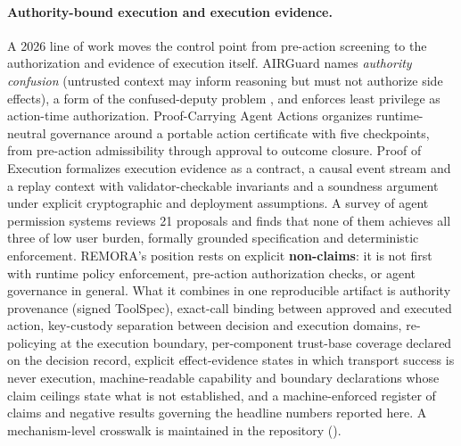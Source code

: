 \documentclass[10pt,twocolumn]{article}
\begin{document}
\paragraph{Authority-bound execution and execution evidence.}
A 2026 line of work moves the control point from pre-action screening to
the authorization and evidence of execution itself. AIRGuard
\cite{qin2026airguard} names \emph{authority confusion} (untrusted
context may inform reasoning but must not authorize side effects), a form
of the confused-deputy problem \cite{hardy1988confused}, and
enforces least privilege as action-time authorization. Proof-Carrying
Agent Actions \cite{wang2026pcaa} organizes runtime-neutral governance
around a portable action certificate with five checkpoints, from
pre-action admissibility through approval to outcome closure. Proof of
Execution \cite{rhodes2026poe} formalizes execution evidence as a
contract, a causal event stream and a replay context with
validator-checkable invariants and a soundness argument under explicit
cryptographic and deployment assumptions. A survey of agent permission
systems \cite{michael2026permission} reviews 21 proposals and finds
that none of them achieves all three of low user burden, formally
grounded specification and deterministic enforcement. REMORA's position rests on
explicit \textbf{non-claims}: it is not first with runtime policy
enforcement, pre-action authorization checks, or agent governance in
general. What it combines in one reproducible artifact is authority
provenance (signed ToolSpec), exact-call binding between approved and
executed action, key-custody separation between decision and execution
domains, re-policying at the execution boundary, per-component
trust-base coverage declared on the decision record, explicit
effect-evidence states in which transport success is never execution,
machine-readable capability and boundary declarations whose claim
ceilings state what is not established,
and a machine-enforced register of claims and negative results
governing the headline numbers reported here. A mechanism-level crosswalk is
maintained in the repository
().
\end{document}
